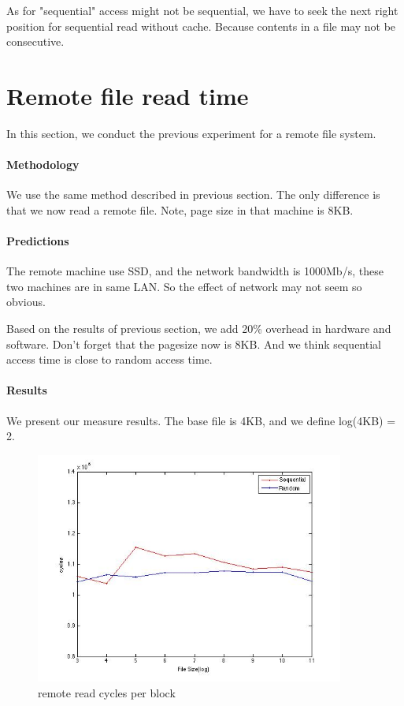 As for "sequential" access might not be sequential, we have to seek the next right position for sequential read without cache. Because contents in a file may not be consecutive.

\section{Remote file read time}
In this section, we conduct the previous experiment for a remote file system.

\paragraph{Methodology}
We use the same method described in previous section. The only difference is that we now read a remote file. Note, page size in that machine is 8KB.

\paragraph{Predictions}
The remote machine use SSD, and the network bandwidth is 1000Mb/s, these two machines are in same LAN. So the effect of network may not seem so obvious.

Based on the results of previous section, we add 20\% overhead in hardware and software. Don't forget that the pagesize now is 8KB. And we think sequential access time is close to random access time. 

\paragraph{Results}

We present our measure results. The base file is 4KB, and we define log(4KB) = 2.

\begin{figure}[htbp] %
   \centering
   \includegraphics[width=4in]{./pics/43.jpg} 
   \caption{remote read cycles per block}
   \label{fig:remote read cycles per block}
\end{figure}

